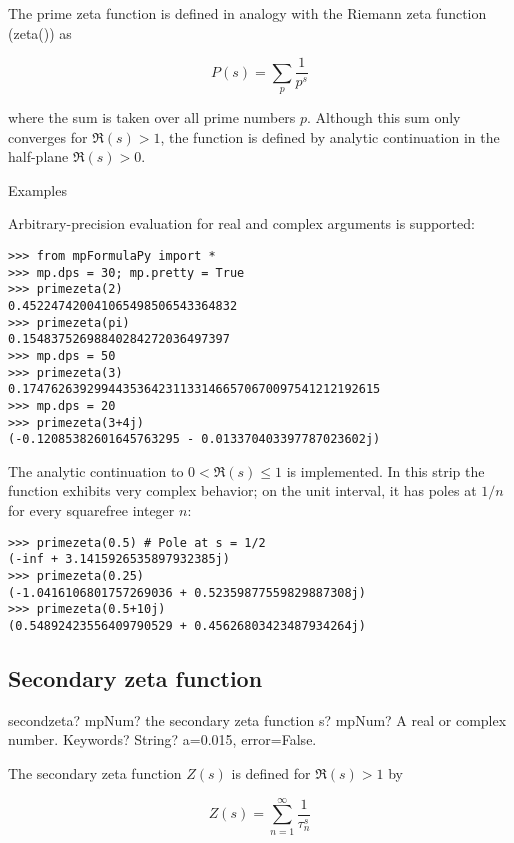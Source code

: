\vpara
The prime zeta function is defined in analogy with the Riemann zeta function (zeta()) as

\begin{equation}
P(s) = \sum_p \frac{1}{p^s}
\end{equation}

where the sum is taken over all prime numbers $p$. Although this sum only converges for $\Re(s)>1$, the function is defined by analytic continuation in the half-plane $\Re(s)>0$.

Examples

Arbitrary-precision evaluation for real and complex arguments is supported:

\begin{lstlisting}
>>> from mpFormulaPy import *
>>> mp.dps = 30; mp.pretty = True
>>> primezeta(2)
0.452247420041065498506543364832
>>> primezeta(pi)
0.15483752698840284272036497397
>>> mp.dps = 50
>>> primezeta(3)
0.17476263929944353642311331466570670097541212192615
>>> mp.dps = 20
>>> primezeta(3+4j)
(-0.12085382601645763295 - 0.013370403397787023602j)
\end{lstlisting}

The analytic continuation to $0<\Re(s) \leq 1$ is implemented. In this strip the function exhibits very complex behavior; on the unit interval, it has poles at $1/n$ for every squarefree integer $n$:

\begin{lstlisting}
>>> primezeta(0.5) # Pole at s = 1/2
(-inf + 3.1415926535897932385j)
>>> primezeta(0.25)
(-1.0416106801757269036 + 0.52359877559829887308j)
>>> primezeta(0.5+10j)
(0.54892423556409790529 + 0.45626803423487934264j)
\end{lstlisting}


\subsection{Secondary zeta function }

\begin{mpFunctionsExtract}
	\mpFunctionTwo
	{secondzeta? mpNum? the secondary zeta function}
	{s? mpNum? A real or complex number.}
	{Keywords? String? a=0.015, error=False.}	
\end{mpFunctionsExtract}

\vpara
The secondary zeta function $Z(s)$ is defined for $\Re(s)>1$ by

\begin{equation}
Z(s)=\sum_{n=1}^{\infty} \frac{1}{\tau_n^s}
\end{equation}

